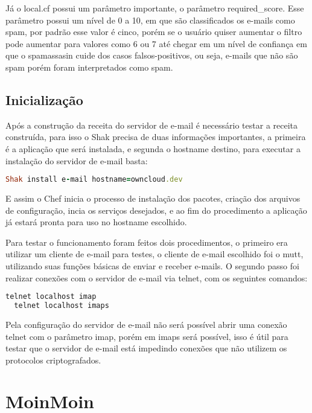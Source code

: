 Já o local.cf possui um parâmetro importante, o
parâmetro required\_score. Esse parâmetro possui um nível de 0 a 10, em que 
são classificados os e-mails como spam, por padrão esse valor é cinco, porém se 
o usuário quiser aumentar o filtro pode aumentar para valores como 6 ou 7 até chegar em um nível de confiança em que o spamassasin cuide dos casos falsos-positivos, ou seja, 
e-mails que não são spam porém foram interpretados como spam.

\subsection{Inicialização}

Após a construção da receita do servidor de e-mail é necessário testar a receita construída,
para isso o Shak precisa de duas informações importantes, a primeira é a aplicação
que será instalada, e segunda o hostname destino, para executar a instalação
do servidor de e-mail basta:

\begin{lstlisting}[language=Ruby,label=dice_index,caption={Exemplo de execução de instalação do servidor de e-mailcom shak}]
Shak install e-mail hostname=owncloud.dev
\end{lstlisting}


E assim o Chef inicia o processo de instalação dos pacotes, criação dos arquivos
de configuração, incia os serviços desejados, e ao fim do procedimento a aplicação
já estará pronta para uso no hostname escolhido.

Para testar o funcionamento foram feitos dois procedimentos, o primeiro era utilizar
um cliente de e-mail para testes, o cliente de e-mail escolhido foi o mutt, utilizando
suas funções básicas de enviar e receber e-mails. O segundo passo foi realizar conexões
com o servidor de e-mail via telnet, com os seguintes comandos:

\begin{lstlisting}[language=Ruby,label=dice_index,caption={Exemplo de teste de conexão telnet no servidor imap}]
  telnet localhost imap
  telnet localhost imaps
\end{lstlisting}

Pela configuração do servidor de e-mail não será possível abrir uma conexão telnet
com o parâmetro imap, porém em imaps será possível, isso é útil para testar 
que o servidor de e-mail está impedindo conexões que não 
utilizem os protocolos criptografados.

\section{MoinMoin}
\label{sub:owncloud}

